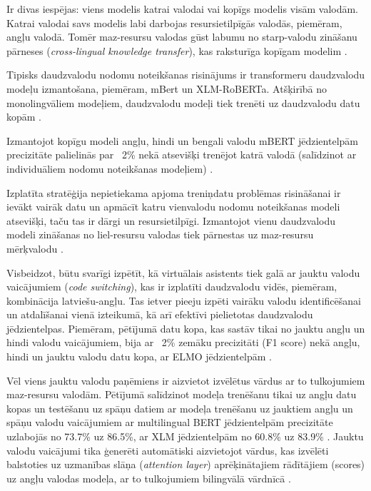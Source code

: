 Ir divas iespējas: viens modelis katrai valodai vai kopīgs modelis visām valodām. Katrai valodai savs modelis labi darbojas resursietilpīgās valodās, piemēram, angļu valodā. Tomēr maz-resursu valodas gūst labumu no starp-valodu zināšanu pārneses (\textit{cross-lingual knowledge transfer}), kas raksturīga kopīgam modelim \cite{de-bruyn-2022}.

Tipisks daudzvalodu nodomu noteikšanas risinājums ir transformeru daudzvalodu modeļu izmantošana, piemēram, mBert un XLM-RoBERTa. Atšķirībā no monolingvāliem modeļiem, daudzvalodu modeļi tiek trenēti uz daudzvalodu datu kopām \cite{de-bruyn-2022}. 

Izmantojot kopīgu modeli angļu, hindi un bengali valodu mBERT jēdzientelpām precizitāte palielinās par ~2\% nekā atsevišķi trenējot katrā valodā (salīdzinot ar individuāliem nodomu noteikšanas modeļiem) \cite{firdaus2023}.



Izplatīta stratēģija nepietiekama apjoma treniņdatu problēmas risināšanai ir ievākt vairāk datu un apmācīt katru vienvalodu nodomu noteikšanas modeli atsevišķi, taču tas ir dārgi un resursietilpīgi. Izmantojot vienu daudzvalodu modeli zināšanas no liel-resursu valodas tiek pārnestas uz maz-resursu mērķvalodu \cite{liu2020}.

Visbeidzot, būtu svarīgi izpētīt, kā virtuālais asistents tiek galā ar jauktu valodu vaicājumiem (\textit{code switching}), kas ir izplatīti daudzvalodu vidēs, piemēram, kombinācija latviešu-angļu. Tas ietver pieeju izpēti vairāku valodu identificēšanai un atdalīšanai vienā izteikumā, kā arī efektīvi pielietotas daudzvalodu jēdzientelpas. Piemēram, pētījumā datu kopa, kas sastāv tikai no jauktu angļu un hindi valodu vaicājumiem, bija ar ~2\% zemāku precizitāti (F1 score) nekā angļu, hindi un jauktu valodu datu kopa, ar ELMO jēdzientelpām \cite{jayarao2018}.

Vēl viens jauktu valodu paņēmiens ir aizvietot izvēlētus vārdus ar to tulkojumiem maz-resursu valodām. Pētījumā salīdzinot modeļa trenēšanu tikai uz angļu datu kopas un testēšanu uz spāņu datiem ar modeļa trenēšanu uz jauktiem angļu un spāņu valodu vaicājumiem ar multilingual BERT jēdzientelpām precizitāte uzlabojās no 73.7\% uz 86.5\%, ar XLM jēdzientelpām no 60.8\% uz 83.9\% \cite{liu2020}. Jauktu valodu vaicājumi tika ģenerēti automātiski aizvietojot vārdus, kas izvēlēti balstoties uz uzmanības slāņa (\textit{attention layer}) aprēķinātajiem rādītājiem (scores) uz angļu valodas modeļa, ar to tulkojumiem bilingvālā vārdnīcā \cite{liu2020}. 

